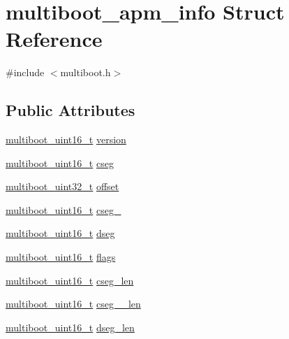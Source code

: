 \hypertarget{structmultiboot__apm__info}{}\section{multiboot\+\_\+apm\+\_\+info Struct Reference}
\label{structmultiboot__apm__info}


{\ttfamily \#include $<$multiboot.\+h$>$}

\subsection*{Public Attributes}
\begin{DoxyCompactItemize}
\item 
\hyperlink{multiboot_8h_a3a11e3c2b5e0617736a05343aa5795b3}{multiboot\+\_\+uint16\+\_\+t} \hyperlink{structmultiboot__apm__info_ab06d9309bdc00fa4a8c37fdab639beb5}{version}
\item 
\hyperlink{multiboot_8h_a3a11e3c2b5e0617736a05343aa5795b3}{multiboot\+\_\+uint16\+\_\+t} \hyperlink{structmultiboot__apm__info_a9eedcae62ee49310914e238d07094c4b}{cseg}
\item 
\hyperlink{multiboot_8h_a009f355da41fed4badb8a52d432f5186}{multiboot\+\_\+uint32\+\_\+t} \hyperlink{structmultiboot__apm__info_a97958b174fe0234cafab9019eb009b91}{offset}
\item 
\hyperlink{multiboot_8h_a3a11e3c2b5e0617736a05343aa5795b3}{multiboot\+\_\+uint16\+\_\+t} \hyperlink{structmultiboot__apm__info_a9abc154a9c3a0f3d9ae96cf2b5044b43}{cseg\+\_}
\item 
\hyperlink{multiboot_8h_a3a11e3c2b5e0617736a05343aa5795b3}{multiboot\+\_\+uint16\+\_\+t} \hyperlink{structmultiboot__apm__info_a98cd7da8760cf5d49ba55e1f9e76c6d4}{dseg}
\item 
\hyperlink{multiboot_8h_a3a11e3c2b5e0617736a05343aa5795b3}{multiboot\+\_\+uint16\+\_\+t} \hyperlink{structmultiboot__apm__info_a55fb7837ae61f63d0310b65767a2505c}{flags}
\item 
\hyperlink{multiboot_8h_a3a11e3c2b5e0617736a05343aa5795b3}{multiboot\+\_\+uint16\+\_\+t} \hyperlink{structmultiboot__apm__info_a95aa6b556019e1b9c526b190341cc531}{cseg\+\_\+len}
\item 
\hyperlink{multiboot_8h_a3a11e3c2b5e0617736a05343aa5795b3}{multiboot\+\_\+uint16\+\_\+t} \hyperlink{structmultiboot__apm__info_a09573729600592739fe8f2480217a30d}{cseg\+\_\+\_\+len}
\item 
\hyperlink{multiboot_8h_a3a11e3c2b5e0617736a05343aa5795b3}{multiboot\+\_\+uint16\+\_\+t} \hyperlink{structmultiboot__apm__info_afee11d31183fe424af90546b10c9fac2}{dseg\+\_\+len}
\end{DoxyCompactItemize}


